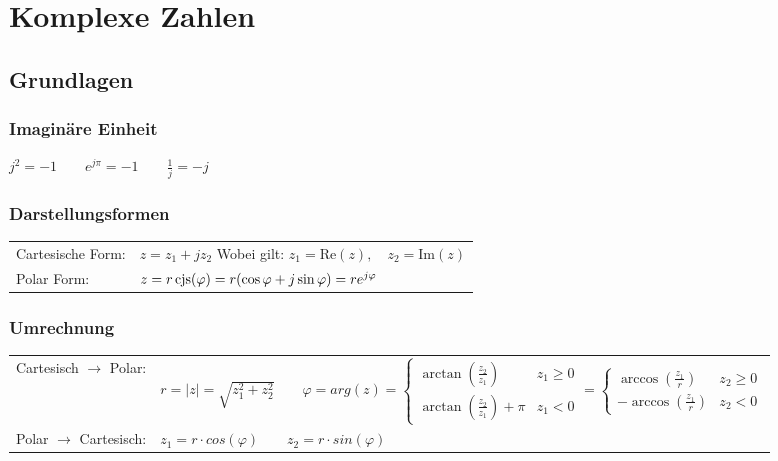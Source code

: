 \section{Komplexe Zahlen}
\subsection{Grundlagen}
\subsubsection{Imaginäre Einheit}
$j^2 = -1 \qquad e^{j\pi} = -1 \qquad \frac{1}{j} = -j$

\subsubsection{Darstellungsformen}
\begin{tabular}{ll}
	Cartesische Form: & $z = z_1 + j z_2$ \quad Wobei gilt: $z_1 = \text{Re}(z),
	\quad z_2 = \text{Im}(z)$ \\
	Polar Form: &   $z = r \operatorname{cjs}(\varphi) = r(\cos{\varphi} + j\sin{\varphi}) = r
	e^{j \varphi}$ 	\\
\end{tabular}
\subsubsection{Umrechnung}
\begin{tabular}{ll}
	Cartesisch $\rightarrow$ Polar: & $r = |z| = \sqrt{z_1^2 + z_2^2} \qquad   
		\varphi = arg(z) 
		        = 	\begin{cases} 
                       	\arctan(\frac{z_2}{z_1}) &z_1 \geq 0\\
                  		\arctan(\frac{z_2}{z_1}) + \pi &z_1 < 0
          			\end{cases}
          		=	\begin{cases}
          				\arccos(\frac{z_1}{r}) & z_2 \geq 0 \\
          				-\arccos(\frac{z_1}{r}) & z_2 < 0          		
          			\end{cases}$ \\
          			
	Polar $\rightarrow$ Cartesisch: & $z_1 = r \cdot cos(\varphi) \qquad z_2 = r
	\cdot sin(\varphi)$ \\
\end{tabular}


